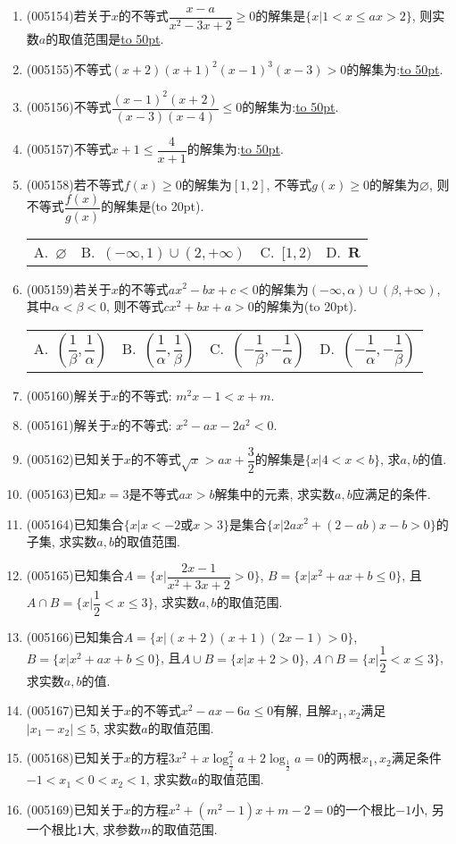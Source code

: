 \documentclass[10pt,a4paper]{article}
\newcommand{\blank}[1]{\underline{\hbox to #1pt{}}}
\newcommand{\bracket}[1]{(\hbox to #1pt{})}
\newcommand{\fourch}[4]{\par\begin{tabular}{p{.23\textwidth}p{.23\textwidth}p{.23\textwidth}p{.23\textwidth}}
A.~#1 &B.~#2& C.~#3& D.~#4
\end{tabular}}
\begin{document}
\begin{enumerate}[1.]
\item {\tiny (005154)}若关于$x$的不等式$\dfrac{x-a}{x^2-3x+2}\ge 0$的解集是$\{x|1<x\le ax>2\}$, 则实数$a$的取值范围是\blank{50}.
\item {\tiny (005155)}不等式$(x+2)(x+1)^2(x-1)^3(x-3)>0$的解集为:\blank{50}.
\item {\tiny (005156)}不等式$\dfrac{(x-1)^2(x+2)}{(x-3)(x-4)}\le 0$的解集为:\blank{50}.
\item {\tiny (005157)}不等式$x+1\le \dfrac 4{x+1}$的解集为:\blank{50}.
\item {\tiny (005158)}若不等式$f(x)\ge 0$的解集为$[1,2]$, 不等式$g(x)\ge 0$的解集为$\varnothing$, 则不等式$\dfrac{f(x)}{g(x)}$的解集是\bracket{20}.
\fourch{$\varnothing$}{$(-\infty ,1)\cup (2,+\infty)$}{$[1,2)$}{$\mathbf{R}$}
\item {\tiny (005159)}若关于$x$的不等式$ax^2-bx+c<0$的解集为$(-\infty ,\alpha)\cup (\beta ,+\infty)$, 其中$\alpha <\beta <0$, 则不等式$cx^2+bx+a>0$的解集为\bracket{20}.
\fourch{$(\dfrac 1{\beta},\dfrac 1{\alpha})$}{$(\dfrac 1{\alpha},\dfrac 1{\beta})$}{$(-\dfrac 1{\beta},-\dfrac 1{\alpha})$}{$(-\dfrac 1{\alpha},-\dfrac 1{\beta})$}
\item {\tiny (005160)}解关于$x$的不等式: $m^2x-1<x+m$.
\item {\tiny (005161)}解关于$x$的不等式: $x^2-ax-2a^2<0$.
\item {\tiny (005162)}已知关于$x$的不等式$\sqrt x>ax+\dfrac 32$的解集是$\{x|4<x<b\}$, 求$a,b$的值.
\item {\tiny (005163)}已知$x=3$是不等式$ax>b$解集中的元素, 求实数$a,b$应满足的条件.
\item {\tiny (005164)}已知集合$\{x|x<-2\text{或}x>3\}$是集合$\{x|2ax^2+(2-ab)x-b>0\}$的子集, 求实数$a,b$的取值范围.
\item {\tiny (005165)}已知集合$A=\{x|\dfrac{2x-1}{x^2+3x+2}>0\}$, $B=\{x|x^2+ax+b\le 0\}$, 且$A\cap B=\{x|\dfrac 12<x\le 3\}$, 求实数$a,b$的取值范围.
\item {\tiny (005166)}已知集合$A=\{x|(x+2)(x+1)(2x-1)>0\}$, $B=\{x|x^2+ax+b\le 0\}$, 且$A\cup B=\{x|x+2 >0\}$, $A\cap B=\{x|\dfrac 12<x\le 3\}$, 求实数$a,b$的值.
\item {\tiny (005167)}已知关于$x$的不等式$x^2-ax-6a\le 0$有解, 且解$x_1,x_2$满足$|x_1-x_2|\le 5$, 求实数$a$的取值范围.
\item {\tiny (005168)}已知关于$x$的方程$3x^2+x\log_{\frac 12}^2a+2\log_{\frac 12}a=0$的两根$x_1,x_2$满足条件$-1<x_1<0<x_2<1$, 求实数$a$的取值范围.
\item {\tiny (005169)}已知关于$x$的方程$x^2+(m^2-1)x+m-2=0$的一个根比$-1$小, 另一个根比$1$大, 求参数$m$的取值范围.

\end{enumerate}
\end{document}
